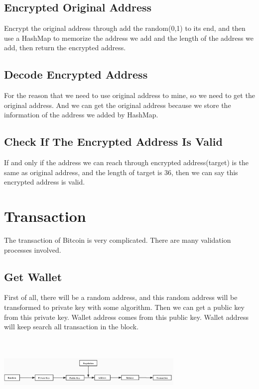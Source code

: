 \documentclass[conference]{IEEEtran}
\begin{document}
\subsection{Encrypted Original Address}
Encrypt the original address through add the random(0,1) to its end, and then use a HashMap to memorize the address we add and the length of the address we add, then return the encrypted address.

\subsection{Decode Encrypted Address}
For the reason that we need to use original address to mine, so we need to get the original address. And we can get the original address because we store the information of the address we added by HashMap.

\subsection{Check If The Encrypted Address Is Valid}
If and only if the address we can reach through encrypted address(target) is the same as original address, and the length of target is 36, then we can say this encrypted address is valid\cite{cormen2009introduction}.

\section{Transaction}
The transaction of Bitcoin is very complicated. There are many validation processes involved\cite{moser2013anonymity}. 
\subsection{Get Wallet}
First of all, there will be a random address, and this random address will be transformed to private key with some algorithm. Then we can get a public key from this private key. Wallet address comes from this public key. Wallet address will keep search all transaction in the block.

\\
\\
\includegraphics[width=9cm]{likai2.png}
\\
\\
\end{document}
